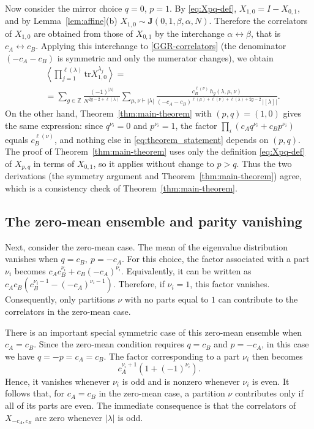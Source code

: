 \documentclass{article}
\newcommand{\tr}{\mathrm{tr}}
\theoremstyle{plain}
\theoremstyle{definition}
\numberwithin{equation}{section}
\begin{document}
Now consider the mirror choice $q=0$, $p=1$. By \eqref{eq:Xpq-def}, $X_{1,0}=I-X_{0,1}$, and by Lemma~\ref{lem:affine}(b) $X_{1,0}\sim\mathbf J(0,1,\beta,\alpha,N)$. Therefore the correlators of $X_{1,0}$ are obtained from those of $X_{0,1}$ by the interchange $\alpha\leftrightarrow\beta$, that is $c_A\leftrightarrow c_B$. Applying this interchange to \eqref{GGR-correlators} (the denominator $(-c_A-c_B)$ is symmetric and only the numerator changes), we obtain
\begin{equation}
    \label{GGR-correlators_repeat_B}
    \begin{aligned}
        & \left<\prod_{j=1}^{\ell(\lambda)}\tr X^{\lambda_{j}}_{1,0}\right> = \\
        & = \sum_{g\in \mathbb{Z}}\frac{(-1)^{|\lambda|}}{N^{2g-2+\ell(\lambda)}}\sum_{\mu,\nu\vdash|\lambda|}\frac{c_{B}^{\ell(\nu)}\, h_{g}(\lambda,\mu,\nu)}{(-c_{A}-c_{B})^{\ell(\mu)+\ell(\nu)+\ell(\lambda)+2g-2}\, |[\lambda]|}.
    \end{aligned}
\end{equation}
On the other hand, Theorem~\ref{thm:main-theorem} with $(p,q)=(1,0)$ gives the same expression: since $q^{\nu_i}=0$ and $p^{\nu_i}=1$, the factor $\prod_{i}(c_Aq^{\nu_i}+c_Bp^{\nu_i})$ equals $c_B^{\ell(\nu)}$, and nothing else in \eqref{eq:theorem_statement} depends on $(p,q)$. The proof of Theorem~\ref{thm:main-theorem} uses only the definition \eqref{eq:Xpq-def} of $X_{p,q}$ in terms of $X_{0,1}$, so it applies without change to $p>q$. Thus the two derivations (the symmetry argument and Theorem~\ref{thm:main-theorem}) agree, which is a consistency check of Theorem~\ref{thm:main-theorem}.

\subsection{The zero-mean ensemble and parity vanishing}
\label{subs:zero-mean}

Next, consider the zero-mean case. The mean of the eigenvalue distribution vanishes when $q=c_B,\ p=-c_A$. For this choice, the factor associated with a part $\nu_i$ becomes
$c_Ac_B^{\nu_i}+c_B(-c_A)^{\nu_i}$. Equivalently, it can be written as
$c_Ac_B(c_B^{\nu_i-1}-(-c_A)^{\nu_i-1})$. Therefore, if $\nu_i=1$, this factor vanishes. Consequently, only partitions $\nu$ with no parts equal to $1$ can contribute to the correlators in the zero-mean case. 

There is an important special symmetric case of this zero-mean ensemble when $c_A=c_B$. Since the zero-mean condition requires $q=c_B$ and $p=-c_A$, in this case we have $q=-p=c_A=c_B$. The factor corresponding to a part $\nu_i$ then becomes
\begin{equation}
    c_A^{\nu_i+1}\left(1+(-1)^{\nu_i}\right).
\end{equation}
Hence, it vanishes whenever $\nu_i$ is odd and is nonzero whenever $\nu_i$ is even. It follows that, for $c_A=c_B$ in the zero-mean case, a partition $\nu$ contributes only if all of its parts are even. The immediate consequence is that the correlators of $X_{-c_A,c_B}$ are zero whenever $|\lambda|$ is odd.
\end{document}
